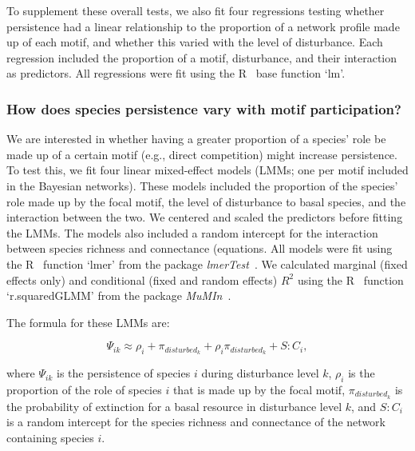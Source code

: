 \documentclass[12pt]{article}
\begin{document}
\begin{spacing}{2.0}
            
            To supplement these overall tests, we also fit four regressions testing whether persistence had a linear relationship to the proportion of a network profile made up of each motif, and whether this varied with the level of disturbance.
            Each regression included the proportion of a motif, disturbance, and their interaction as predictors.
            All regressions were fit using the R~\citep{R} base function `lm'.
        
        
        \subsubsection*{How does species persistence vary with motif participation?}

            We are interested in whether having a greater proportion of a species' role be made up of a certain motif (e.g., direct competition) might increase persistence.
            To test this, we fit four linear mixed-effect models (LMMs; one per motif included in the Bayesian networks).
            These models included the proportion of the species' role made up by the focal motif, the level of disturbance to basal species, and the interaction between the two.
            We centered and scaled the predictors before fitting the LMMs.
            The models also included a random intercept for the interaction between species richness and connectance (equations.
            All models were fit using the R~\citep{R} function `lmer' from the package \emph{lmerTest}~\citep{lmerTest}.
            We calculated marginal (fixed effects only) and conditional (fixed and random effects) $R^2$ using the R~\citep{R} function `r.squaredGLMM' from the package \emph{MuMIn}~\citep{MuMIn}.

            The formula for these LMMs are:       
            
            \begin{equation}
                \Psi_{ik} \approx \rho_{i} + \pi_{disturbed_k} + \rho_{i}\pi_{disturbed_k} +
                S:C_{i} ,
                \label{propreq}
            \end{equation}


            where $\Psi_{ik}$ is the persistence of species $i$ during disturbance level $k$, $\rho_{i}$ is the proportion of the role of species $i$ that is made up by the focal motif, $\pi_{disturbed_k}$ is the probability of extinction for a basal resource in disturbance level $k$, and $S:C_{i}$ is a random intercept for the species richness and connectance of the network containing species $i$.
    

\end{spacing}
\end{document}
